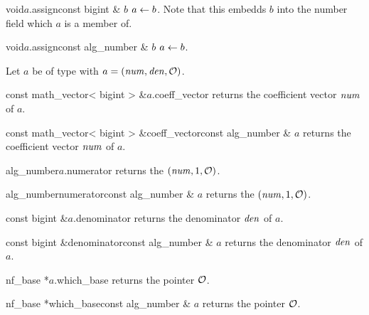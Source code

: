 \begin{fcode}{void}{$a$.assign}{const bigint & $b$}
  $a \leftarrow b$.  Note that this embedds $b$ into the number field which $a$ is a member of.
\end{fcode}

\begin{fcode}{void}{$a$.assign}{const alg_number & $b$}
  $a \leftarrow b$.
\end{fcode}



\ACCS

Let $a$ be of type  with $a = (\mathit{num}, \mathit{den}, \mathcal{O})$.

\begin{cfcode}{const math_vector< bigint > &}{$a$.coeff_vector}{}
  returns the coefficient vector $\mathit{num}$ of $a$.
\end{cfcode}

\begin{fcode}{const math_vector< bigint > &}{coeff_vector}{const alg_number & $a$}
  returns the coefficient vector $\mathit{num}$ of $a$.
\end{fcode}

\begin{cfcode}{alg_number}{$a$.numerator}{}
  returns the  $(\mathit{num}, 1, \mathcal{O})$.
\end{cfcode}

\begin{fcode}{alg_number}{numerator}{const alg_number & $a$}
  returns the  $(\mathit{num}, 1, \mathcal{O})$.
\end{fcode}

\begin{cfcode}{const bigint &}{$a$.denominator}{}
  returns the denominator $\mathit{den}$ of $a$.
\end{cfcode}

\begin{fcode}{const bigint &}{denominator}{const alg_number & $a$}
  returns the denominator $\mathit{den}$ of $a$.
\end{fcode}

\begin{cfcode}{nf_base *}{$a$.which_base}{}
  returns the pointer $\mathcal{O}$.
\end{cfcode}

\begin{fcode}{nf_base *}{which_base}{const alg_number & $a$}
  returns the pointer $\mathcal{O}$.
\end{fcode}


